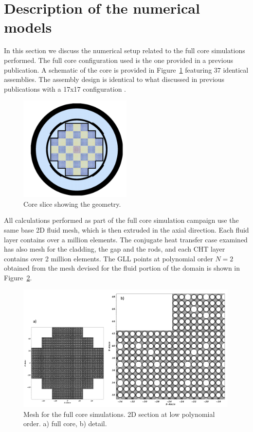 \section{Description of the numerical models}
\label{sec:model}

In this section we discuss the numerical setup related to the full core simulations performed.
The full core configuration used is the one provided in a previous publication. A schematic of the core is provided in Figure~\ref{fig:core} featuring 37 identical assemblies. The assembly design is identical to what discussed in previous publications with a 17x17 configuration \cite{merzari2020wall}.

\begin{figure}[!ht]
\centering
\includegraphics[width=0.5\textwidth]{./figures/core_slice.png}
\caption{Core slice showing the geometry.}
\label{fig:core}
\end{figure}

All calculations performed as part of the full core simulation campaign use the same base 2D fluid mesh, which is then extruded in the axial direction. Each fluid layer contains over a million elements. The conjugate heat transfer case examined has also mesh for the cladding, the gap and the rods, and each CHT layer contains over 2 million elements. The GLL points at polynomial order $N=2$ obtained from the mesh devised for the fluid portion of the domain is shown in Figure~\ref{fig:mesh1}.

\begin{figure}[!ht]
\centering
\includegraphics[width=0.99\textwidth]{./figures/full_core_mesh.png}
\caption{Mesh for the full core simulations. 2D section at low polynomial order. a) full core, b) detail.}
\label{fig:mesh1}
\end{figure}


